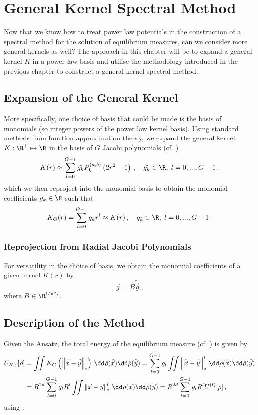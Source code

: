 \chapter{General Kernel Spectral Method}
\label{chap:general-kernel-spectral-method}

Now that we know how to treat power law potentials in the construction of a spectral method for the solution of equilibrium measures, can we consider more general kernels as well?
The approach in this chapter will be to expand a general kernel $K$ in a power law basis and utilise the methodology introduced in the previous chapter to construct a general kernel spectral method.

\section{Expansion of the General Kernel}
More specifically, one choice of basis that could be made is the basis of monomials (so integer powers of the power law kernel basis).
Using standard methods from function approximation theory, we expand the general kernel $K: \R^+ \mapsto \R$ in the basis of $G$ Jacobi polynomials (cf. )
$$K(r) \approx \sum_{l=0}^{G-1} \tilde{g_k} P_k^{(a, b)}\left(2 r^2 - 1\right)\,, \quad \tilde{g_k} \in \R, \;l = 0, ..., G-1\,,$$
which we then reproject into the monomial basis to obtain the monomial coefficients $g_k \in \R$ such that
\begin{equation}
  K_G(r) = \sum_{l=0}^{G-1} g_k r^l \approx K(r)\,,\quad g_k \in \R, \;l=0, ..., G-1\,.
  \label{eq:monomial-expansion}
\end{equation}

\subsection{Reprojection from Radial Jacobi Polynomials}
For versatility in the choice of basis, we obtain the monomial coefficients of a given kernel $K(r)$ by
$$\vec{g} = B \tilde{\vec{g}}\,,$$
where $B \in \R^{G \times G}$.


\section{Description of the Method}
Given the Ansatz, the total energy of the equilibrium measure (cf. ) is given by
\begin{align*}
  U_{K_G}[\hat{\rho}] & = \iint K_G\left(\norm{\hatvec{x}-\hatvec{y}}\right) \,\dd\hat{\rho}(\hatvec{x})\dd\hat{\rho}(\hatvec{y})
  = \sum_{l=0}^{G-1} g_l \iint \norm{\hatvec{x}-\hatvec{y}}^l \,\dd\hat{\rho}(\hatvec{x})\dd\hat{\rho}(\hatvec{y})                \\
                      & = R^{2d} \sum_{l=0}^{G-1} g_l R^l \iint \norm{\vec{x}-\vec{y}}^l \,\dd\rho(\vec{x})\dd\rho(\vec{y})
  = R^{2d} \sum_{l=0}^{G-1} g_l R^l U^{(l)}[\rho]\,,
\end{align*}
using .

